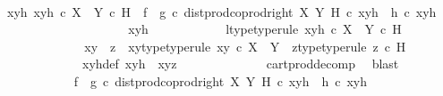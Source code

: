 \begin{isabellebody}
\ \ \ \ \ \ \ \ \isamarkupfalse%
\ {\isachardoublequoteopen}{\isasymAnd}xyh{\isachardot}{\kern0pt}\ xyh\ {\isasymin}\isactrlsub c\ {\isacharparenleft}{\kern0pt}X\ {\isasymCoprod}\ Y{\isacharparenright}{\kern0pt}\ {\isasymtimes}\isactrlsub c\ H\ {\isasymLongrightarrow}\ {\isacharparenleft}{\kern0pt}f\isactrlsup {\isasymflat}\ {\isasymamalg}\ g\isactrlsup {\isasymflat}\ {\isasymcirc}\isactrlsub c\ dist{\isacharunderscore}{\kern0pt}prod{\isacharunderscore}{\kern0pt}coprod{\isacharunderscore}{\kern0pt}right\ X\ Y\ H{\isacharparenright}{\kern0pt}\ {\isasymcirc}\isactrlsub c\ xyh\ {\isacharequal}{\kern0pt}\ h\isactrlsup {\isasymflat}\ {\isasymcirc}\isactrlsub c\ xyh{\isachardoublequoteclose}\isanewline
\ \ \ \ \ \ \ \ \isamarkupfalse%
{\isacharminus}{\kern0pt}\isanewline
\ \ \ \ \ \ \ \ \ \ \isamarkupfalse%
\ xyh\isanewline
\ \ \ \ \ \ \ \ \ \ \isamarkupfalse%
\ l{\isacharunderscore}{\kern0pt}type{\isacharbrackleft}{\kern0pt}type{\isacharunderscore}{\kern0pt}rule{\isacharbrackright}{\kern0pt}{\isacharcolon}{\kern0pt}\ {\isachardoublequoteopen}xyh\ {\isasymin}\isactrlsub c\ {\isacharparenleft}{\kern0pt}X\ {\isasymCoprod}\ Y{\isacharparenright}{\kern0pt}\ {\isasymtimes}\isactrlsub c\ H{\isachardoublequoteclose}\isanewline
\ \ \ \ \ \ \ \ \ \ \isamarkupfalse%
\ \isamarkupfalse%
\ xy\ \ z\ \ xy{\isacharunderscore}{\kern0pt}type{\isacharbrackleft}{\kern0pt}type{\isacharunderscore}{\kern0pt}rule{\isacharbrackright}{\kern0pt}{\isacharcolon}{\kern0pt}\ {\isachardoublequoteopen}xy\ {\isasymin}\isactrlsub c\ X\ {\isasymCoprod}\ Y{\isachardoublequoteclose}\ \ z{\isacharunderscore}{\kern0pt}type{\isacharbrackleft}{\kern0pt}type{\isacharunderscore}{\kern0pt}rule{\isacharbrackright}{\kern0pt}{\isacharcolon}{\kern0pt}\ {\isachardoublequoteopen}z\ {\isasymin}\isactrlsub c\ H{\isachardoublequoteclose}\isanewline
\ \ \ \ \ \ \ \ \ \ \ \ \ xyh{\isacharunderscore}{\kern0pt}def{\isacharcolon}{\kern0pt}\ {\isachardoublequoteopen}xyh\ {\isacharequal}{\kern0pt}\ {\isasymlangle}xy{\isacharcomma}{\kern0pt}z{\isasymrangle}{\isachardoublequoteclose}\isanewline
\ \ \ \ \ \ \ \ \ \ \ \ \isamarkupfalse%
\ cart{\isacharunderscore}{\kern0pt}prod{\isacharunderscore}{\kern0pt}decomp\ \isamarkupfalse%
\ blast\isanewline
\ \ \ \ \ \ \ \ \ \ \isamarkupfalse%
\ {\isachardoublequoteopen}{\isacharparenleft}{\kern0pt}f\isactrlsup {\isasymflat}\ {\isasymamalg}\ g\isactrlsup {\isasymflat}\ {\isasymcirc}\isactrlsub c\ dist{\isacharunderscore}{\kern0pt}prod{\isacharunderscore}{\kern0pt}coprod{\isacharunderscore}{\kern0pt}right\ X\ Y\ H{\isacharparenright}{\kern0pt}\ {\isasymcirc}\isactrlsub c\ xyh\ {\isacharequal}{\kern0pt}\ h\isactrlsup {\isasymflat}\ {\isasymcirc}\isactrlsub c\ xyh{\isachardoublequoteclose}\isanewline

\end{isabellebody}
